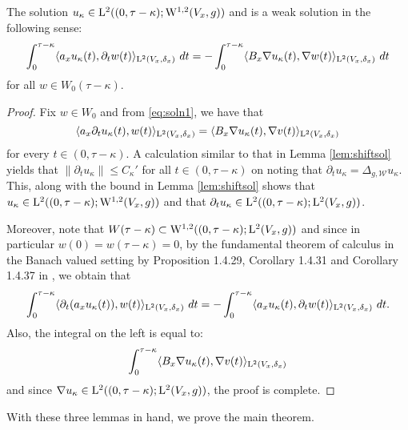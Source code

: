 \documentclass[a4paper, 12pt]{amsart}
\numberwithin{equation}{section}
\renewcommand{\~}{\tilde}
\renewcommand{\-}{\bar}
\newcommand{\8}{\infty}
\newcommand{\cW}{\mathcal{W}}
\newcommand{\norm}[1]{\| #1 \|}			%
\newcommand{\inprod}[1]{\langle #1 \rangle}	%
\newcommand{\Lp}[2][{}]{{\rm L}^{#2}_{\rm #1}}		%
\newcommand{\Sob}[2][{}]{{\rm W}^{#2}_{\rm #1}}		%
\newcommand{\SobH}[2][{}]{{\Sob[#1]{#2,2}}}	%
\begin{document}
\begin{lemma}
\label{Lem:testfn2} 
The solution $u_\kappa \in \Lp{2}((0, \tau - \kappa); \SobH{1}(V_x, g))$
and is a weak solution in the following sense:
\begin{equation}
\label{eq:testfn2} 
\int_{0}^{\tau - \kappa} \inprod{a_x u_\kappa(t), \partial_t w(t)}_{\Lp{2}(V_x,\delta_x)}\ dt 
		= -\int_{0}^{\tau - \kappa } \inprod{B_x \nabla u_\kappa(t), \nabla w(t)}_{\Lp{2}(V_x, \delta_x)}\ dt
\end{equation}
for all $w \in W_0(\tau - \kappa)$.
\end{lemma}
\begin{proof}
Fix $w \in W_0$ and from \eqref{eq:soln1}, we have that
$$\inprod{a_x \partial_t u_\kappa (t), w(t)}_{\Lp{2}(V_x, \delta_x)} 
		= \inprod{ B_x \nabla u_\kappa(t), \nabla v(t)}_{\Lp{2}(V_x, \delta_x)}$$
for every $t \in (0, \tau - \kappa)$.
A calculation similar to that in Lemma \ref{lem:shiftsol} 
yields that $\norm{ \partial_t u_\kappa} \leq C_\kappa'$
for all $t \in (0, \tau - \kappa)$
on noting that $\partial_t u_\kappa = \Delta_{g,\cW} u_\kappa$.
This, along with the bound in Lemma \ref{lem:shiftsol}
shows that  $u_\kappa \in \Lp{2}((0, \tau - \kappa); \SobH{1}(V_x, g))$
and that $\partial_t u_\kappa \in \Lp{2}((0,\tau - \kappa); \Lp{2}(V_x, g))$. 

Moreover, note that $W(\tau- \kappa) \subset \SobH{1}((0,\tau-\kappa); \Lp{2}(V_x,g))$
and since in particular $w(0) = w(\tau - \kappa) = 0$, by the fundamental theorem of calculus in the Banach 
valued setting by Proposition 1.4.29, Corollary 1.4.31 and Corollary 1.4.37 in  \cite{CH}, we obtain that
$$\int_{0}^{\tau - \kappa} \inprod{ \partial_t(a_x u_\kappa(t)), w(t)}_{\Lp{2}(V_x,\delta_x)}\ dt
	= - \int_0^{\tau - \kappa} \inprod{a_x u_\kappa(t), \partial_t w(t)}_{\Lp{2}(V_x, \delta_x)}\ dt.$$
Also, the integral on the left is equal to:
$$ \int_0^{\tau - \kappa}  \inprod{ B_x \nabla u_\kappa(t), \nabla v(t)}_{\Lp{2}(V_x, \delta_x)}$$
and since  $\nabla u_\kappa \in \Lp{2}((0, \tau - \kappa); \Lp{2}(V_x,g))$,
the proof is complete.
\end{proof} 

With these three lemmas in hand, we prove the main theorem.
\end{document}

